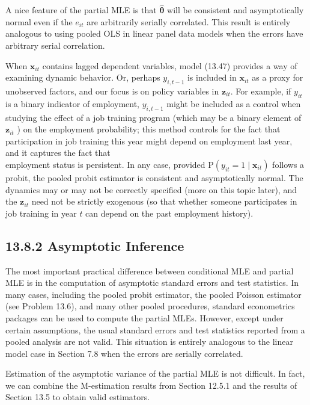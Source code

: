 \documentclass[10pt]{article}
\begin{document}
A nice feature of the partial MLE is that $\hat{\boldsymbol{\theta}}$ will be consistent and asymptotically normal even if the $e_{i t}$ are arbitrarily serially correlated. This result is entirely analogous to using pooled OLS in linear panel data models when the errors have arbitrary serial correlation.

When $\mathbf{x}_{i t}$ contains lagged dependent variables, model (13.47) provides a way of examining dynamic behavior. Or, perhaps $y_{i, t-1}$ is included in $\mathbf{x}_{i t}$ as a proxy for unobserved factors, and our focus is on policy variables in $\mathbf{z}_{i t}$. For example, if $y_{i t}$ is a binary indicator of employment, $y_{i, t-1}$ might be included as a control when studying the effect of a job training program (which may be a binary element of $\mathbf{z}_{i t}$ ) on the employment probability; this method controls for the fact that participation in job training this year might depend on employment last year, and it captures the fact that\\
employment status is persistent. In any case, provided $\mathrm{P}\left(y_{i t}=1 \mid \mathbf{x}_{i t}\right)$ follows a probit, the pooled probit estimator is consistent and asymptotically normal. The dynamics may or may not be correctly specified (more on this topic later), and the $\mathbf{z}_{i t}$ need not be strictly exogenous (so that whether someone participates in job training in year $t$ can depend on the past employment history).

\subsection*{13.8.2 Asymptotic Inference}
The most important practical difference between conditional MLE and partial MLE is in the computation of asymptotic standard errors and test statistics. In many cases, including the pooled probit estimator, the pooled Poisson estimator (see Problem 13.6), and many other pooled procedures, standard econometrics packages can be used to compute the partial MLEs. However, except under certain assumptions, the usual standard errors and test statistics reported from a pooled analysis are not valid. This situation is entirely analogous to the linear model case in Section 7.8 when the errors are serially correlated.

Estimation of the asymptotic variance of the partial MLE is not difficult. In fact, we can combine the M-estimation results from Section 12.5.1 and the results of Section 13.5 to obtain valid estimators.
\end{document}
